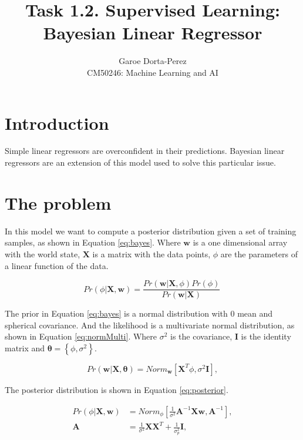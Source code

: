 \documentclass[12pt]{article}
\begin{document}
  
\title{Task 1.2. Supervised Learning:\\ Bayesian Linear Regressor}
\author{Garoe Dorta-Perez\\
CM50246: Machine Learning and AI}
 
\maketitle
 
\section{Introduction}

Simple linear regressors are overconfident in their predictions.
Bayesian linear regressors are an extension of this model used to solve this particular issue.

\section{The problem}

In this model we want to compute a posterior distribution given a set of training samples, as shown in Equation \ref{eq:bayes}. 
Where $\mathbf{w}$ is a one dimensional array with the world state, $\mathbf{X}$ is a matrix with the data points, $\phi$ are the parameters of a linear function of the data.

\begin{equation}
\label{eq:bayes}
Pr(\phi | \mathbf{X}, \mathbf{w} ) = \frac{ Pr(\mathbf{w} | \mathbf{X}, \phi) Pr(\phi)} {Pr(\mathbf{w} | \mathbf{X} )}\,
\end{equation}

The prior in Equation \ref{eq:bayes} is a normal distribution with 0 mean and spherical covariance.
And the likelihood is a multivariate normal distribution, as shown in Equation \ref{eq:normMulti}.
Where  $\sigma^2$ is the covariance, $\mathbf{I}$ is the identity matrix and $\boldsymbol{\theta}= \left\{ \phi, \sigma^2 \right\}$.

\begin{equation}
\label{eq:normMulti}
Pr(\mathbf{w} | \mathbf{X}, \boldsymbol{\theta} ) = Norm_{\mathbf{w}}\left[ \mathbf{X}^T \phi, \sigma^2 \mathbf{I} \right],
\end{equation}

The posterior distribution is shown in Equation \ref{eq:posterior}.

\begin{equation}
\begin{split}
\label{eq:posterior}
Pr(\phi | \mathbf{X}, \mathbf{w} ) &= Norm_{\phi}\left[ \frac{1}{\sigma^2} \mathbf{A}^{-1} \mathbf{X} \mathbf{w}, \mathbf{A}^{-1} \right],\\
\mathbf{A} &= \frac{1}{\sigma^2} \mathbf{X} \mathbf{X}^T + \frac{1}{\sigma^2_p} \mathbf{I},
\end{split}
\end{equation}
\end{document}
